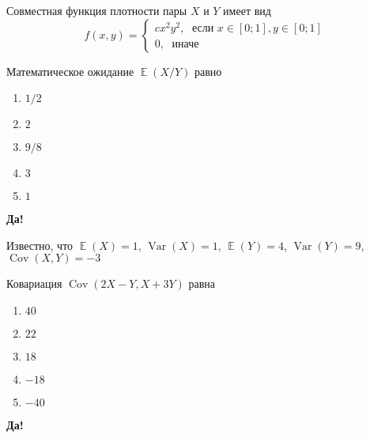 \documentclass[t]{beamer}
\DeclareMathOperator{\Var}{Var}
\DeclareMathOperator{\Cov}{Cov}
\DeclareMathOperator{\E}{\mathbb{E}}
\begin{document}
 \begin{frame} \label{23-Yes} 
\begin{block}{23} 

Совместная функция плотности пары $X$ и $Y$ имеет вид
\[
f(x,y)=\begin{cases}
cx^2y^2, \; \text{ если } x\in[0;1], y\in [0;1] \\
0, \; \text{ иначе}
\end{cases}
\]

\vspace{0.5cm} 
 
 
Математическое ожидание $\E(X/Y)$ равно
 


 \end{block} 
\begin{enumerate} 
\item[] \hyperlink{23-No}{\beamergotobutton{} $1/2$}
\item[] \hyperlink{23-No}{\beamergotobutton{} $2$
}
\item[] \hyperlink{23-Yes}{\beamergotobutton{} $9/8$}
\item[] \hyperlink{23-No}{\beamergotobutton{} $3$}
\item[] \hyperlink{23-No}{\beamergotobutton{} $1$}
\end{enumerate} 

 \textbf{Да!} 
 \hyperlink{24}{}\end{frame} 


 \begin{frame} \label{24-Yes} 
\begin{block}{24} 

Известно, что $\E(X)=1$, $\Var(X)=1$, $\E(Y)=4$, $\Var(Y)=9$, $\Cov(X,Y)=-3$

\vspace{0.5cm} 
 
 
Ковариация $\Cov(2X-Y,X+3Y)$ равна
 


 \end{block} 
\begin{enumerate} 
\item[] \hyperlink{24-No}{\beamergotobutton{} $40$}
\item[] \hyperlink{24-No}{\beamergotobutton{} $22$}
\item[] \hyperlink{24-No}{\beamergotobutton{} $18$
}
\item[] \hyperlink{24-No}{\beamergotobutton{} $-18$}
\item[] \hyperlink{24-Yes}{\beamergotobutton{} $-40$}
\end{enumerate} 

 \textbf{Да!} 
 \hyperlink{25}{}\end{frame} 
\end{document}
